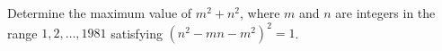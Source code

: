 Determine the maximum value of $m^2+n^2$,  where $m$ and $n$ are integers in the range $1,2,\ldots,1981$ satisfying $(n^2-mn-m^2)^2=1$.